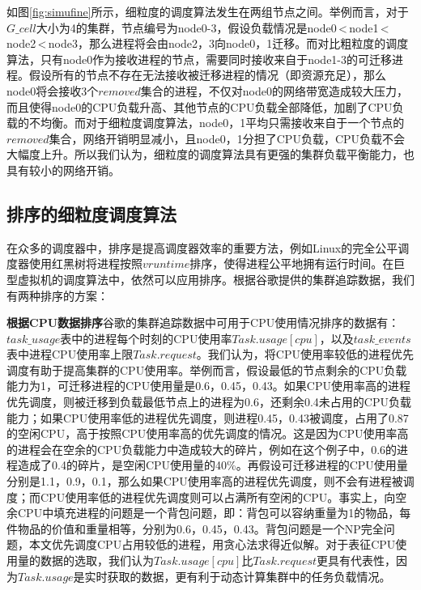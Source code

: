 如图\ref{fig:simufine}所示，细粒度的调度算法发生在两组节点之间。举例而言，对于$G\_cell$大小为4的集群，节点编号为node0-3，假设负载情况是node0\,<\,node1\,<\,node2\,<\,node3，那么进程将会由node2，3向node0，1迁移。而对比粗粒度的调度算法，只有node0作为接收进程的节点，需要同时接收来自于node1-3的可迁移进程。假设所有的节点不存在无法接收被迁移进程的情况（即资源充足），那么node0将会接收3个$removed$集合的进程，不仅对node0的网络带宽造成较大压力，而且使得node0的CPU负载升高、其他节点的CPU负载全部降低，加剧了CPU负载的不均衡。而对于细粒度调度算法，node0，1平均只需接收来自于一个节点的$removed$集合，网络开销明显减小，且node0，1分担了CPU负载，CPU负载不会大幅度上升。所以我们认为，细粒度的调度算法具有更强的集群负载平衡能力，也具有较小的网络开销。

\subsection{排序的细粒度调度算法}
在众多的调度器中，排序是提高调度器效率的重要方法，例如Linux\cite{linux}的完全公平调度器使用红黑树将进程按照$vruntime$排序，使得进程公平地拥有运行时间。在巨型虚拟机的调度算法中，依然可以应用排序。根据谷歌提供的集群追踪数据，我们有两种排序的方案：

\noindent\textbf{根据CPU数据排序}\quad 谷歌的集群追踪数据中可用于CPU使用情况排序的数据有：$task\_usage$表中的进程每个时刻的CPU使用率$Task.usage[cpu]$，以及$task\_events$表中进程CPU使用率上限$Task.request$。我们认为，将CPU使用率较低的进程优先调度有助于提高集群的CPU使用率。举例而言，假设最低的节点剩余的CPU负载能力为1，可迁移进程的CPU使用量是0.6，0.45，0.43。如果CPU使用率高的进程优先调度，则被迁移到负载最低节点上的进程为0.6，还剩余0.4未占用的CPU负载能力；如果CPU使用率低的进程优先调度，则进程0.45，0.43被调度，占用了0.87的空闲CPU，高于按照CPU使用率高的优先调度的情况。这是因为CPU使用率高的进程会在空余的CPU负载能力中造成较大的碎片，例如在这个例子中，0.6的进程造成了0.4的碎片，是空闲CPU使用量的40\%。再假设可迁移进程的CPU使用量分别是1.1，0.9，0.1，那么如果CPU使用率高的进程优先调度，则不会有进程被调度；而CPU使用率低的进程优先调度则可以占满所有空闲的CPU。事实上，向空余CPU中填充进程的问题是一个背包问题，即：背包可以容纳重量为1的物品，每件物品的价值和重量相等，分别为0.6，0.45，0.43。背包问题是一个NP完全问题，本文优先调度CPU占用较低的进程，用贪心法求得近似解。对于表征CPU使用量的数据的选取，我们认为$Task.usage[cpu]$比$Task.request$更具有代表性，因为$Task.usage$是实时获取的数据，更有利于动态计算集群中的任务负载情况。

